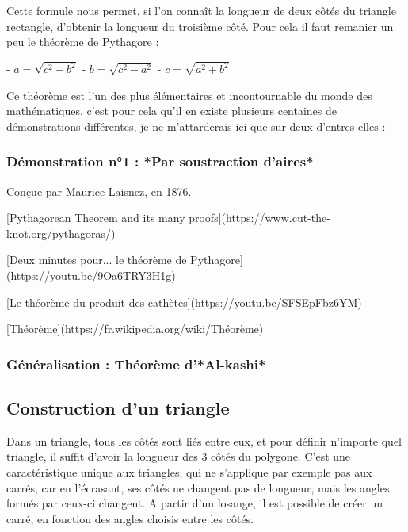 \documentclass[a4paper]{article}
\begin{document}
			Cette formule nous permet, si l'on connaît la longueur de deux côtés du triangle rectangle, d'obtenir la longueur du troisième côté. Pour cela il faut remanier un peu le théorème de Pythagore :

			- $a = \sqrt{c^2 - b^2}$
			- $b = \sqrt{c^2 - a^2}$
			- $c = \sqrt{a^2 + b^2}$

			Ce théorème est l'un des plus élémentaires et incontournable du monde des mathématiques, c'est pour cela qu'il en existe plusieurs centaines de démonstrations différentes, je ne m'attarderais ici que sur deux d'entres elles :

			\subsubsection{Démonstration n°1 : *Par soustraction d'aires*}

				Conçue par Maurice Laisnez, en 1876.

				[Pythagorean Theorem and its many proofs](https://www.cut-the-knot.org/pythagoras/)

				[Deux minutes pour... le théorème de Pythagore](https://youtu.be/9Oa6TRY3H1g)

				[Le théorème du produit des cathètes](https://youtu.be/SFSEpFbz6YM)

				[Théorème](https://fr.wikipedia.org/wiki/Théorème)


			\subsubsection{Généralisation : Théorème d'*Al-kashi*}

		\subsection{Construction d'un triangle}
	
			Dans un triangle, tous les côtés sont liés entre eux, 
			et pour définir n'importe quel triangle, 
			il suffit d'avoir la longueur des 3 côtés du polygone.
			C'est une caractéristique unique aux triangles, 
			qui ne s'applique par exemple pas aux carrés, car en l'écrasant, 
			ses côtés ne changent pas de longueur, 
			mais les angles formés par ceux-ci changent. 
			A partir d'un losange, il est possible de créer un carré, 
			en fonction des angles choisis entre les côtés.
\end{document}
